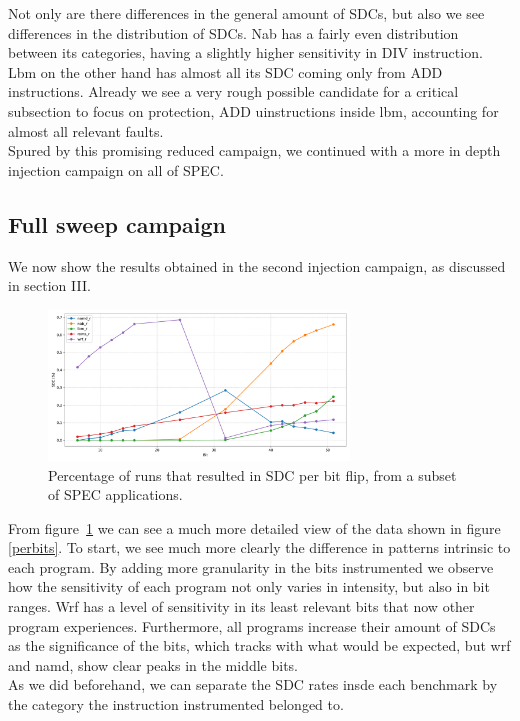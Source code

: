 \documentclass[lettersize,journal]{IEEEtran}
\begin{document}
Not only are there differences in the general amount of SDCs, but also we see differences in the distribution of SDCs. Nab has a fairly even distribution between its categories, having a slightly higher sensitivity in DIV instruction. Lbm on the other hand has almost all its SDC coming only from ADD instructions. Already we see a very rough possible candidate for a critical subsection to focus on protection, ADD uinstructions inside lbm, accounting for almost all relevant faults.\\
Spured by this promising reduced campaign, we continued with a more in depth injection campaign on all of SPEC.

\subsection{Full sweep campaign}
We now show the results obtained in the second injection campaign, as discussed in section III.
\begin{figure}[!t] 
    \centering
    \includegraphics[width=8cm]{plots/sdc_percentage_by_bit.pdf}
\caption{Percentage of runs that resulted in SDC per bit flip, from a subset of SPEC applications.}
\label{general}
\end{figure}
From figure~\ref{general} we can see a much more detailed view of the data shown in figure \ref{perbits}. To start, we see much more clearly the difference in patterns intrinsic to each program. By adding more granularity in the bits instrumented we observe how the sensitivity of each program not only varies in intensity, but also in bit ranges. Wrf has a level of sensitivity in its least relevant bits that now other program experiences. Furthermore, all programs increase their amount of SDCs as the significance of the bits, which tracks with what would be expected, but wrf and namd, show clear peaks in the middle bits. \\
As we did beforehand, we can separate the SDC rates insde each benchmark by the category the instruction instrumented belonged to.
\end{document}
